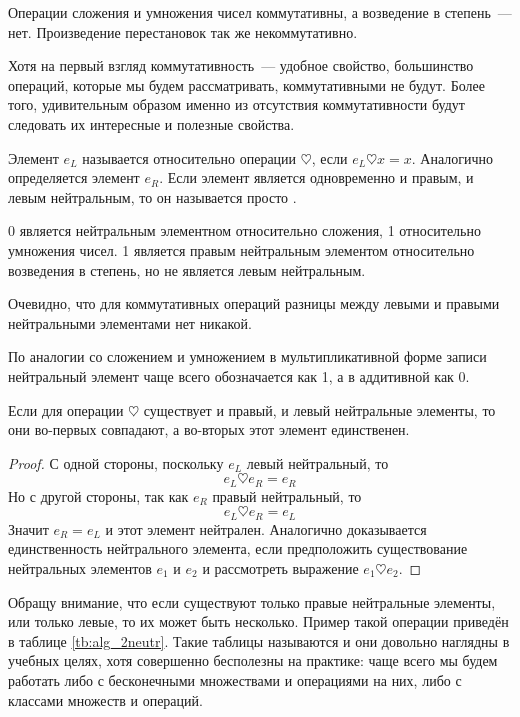 \begin{example}
Операции сложения и умножения чисел коммутативны, а возведение в степень~--- нет. Произведение перестановок так же некоммутативно.
\end{example}

Хотя на первый взгляд коммутативность~--- удобное свойство, большинство операций, которые мы будем рассматривать, коммутативными не будут. Более того, удивительным образом именно из отсутствия коммутативности будут следовать их интересные и полезные свойства.

\begin{definition}
Элемент $e_L$ называется  относительно операции $\heartsuit$, если $e_L\heartsuit x = x$. Аналогично определяется  элемент $e_R$. Если элемент является одновременно и правым, и левым нейтральным, то он называется просто .
\end{definition}

\begin{example}
0 является нейтральным элементном относительно сложения, 1 относительно умножения чисел. 1 является правым нейтральным элементом относительно возведения в степень, но не является левым нейтральным.
\end{example}

Очевидно, что для коммутативных операций разницы между левыми и правыми нейтральными элементами нет никакой.

По аналогии со сложением и умножением в мультипликативной форме записи нейтральный элемент чаще всего обозначается как 1, а в аддитивной как 0.

\begin{thm}
Если для операции $\heartsuit$ существует и правый, и левый нейтральные элементы, то они во-первых совпадают, а во-вторых этот элемент единственен.
\end{thm}
\begin{proof}
С одной стороны, поскольку $e_L$ левый нейтральный, то
$$e_L\heartsuit e_R = e_R$$
Но с другой стороны, так как $e_R$ правый нейтральный, то
$$e_L\heartsuit e_R = e_L$$
Значит $e_R=e_L$ и этот элемент нейтрален. Аналогично доказывается единственность нейтрального элемента, если предположить существование нейтральных элементов $e_1$ и $e_2$ и рассмотреть выражение $e_1\heartsuit e_2$. 
\end{proof}

Обращу внимание, что если существуют только правые нейтральные элементы, или только левые, то их может быть несколько. Пример такой операции приведён в таблице \ref{tb:alg_2neutr}. Такие таблицы называются  и они довольно наглядны в учебных целях, хотя совершенно бесполезны на практике: чаще всего мы будем работать либо с бесконечными множествами и операциями на них, либо с классами множеств и операций.


